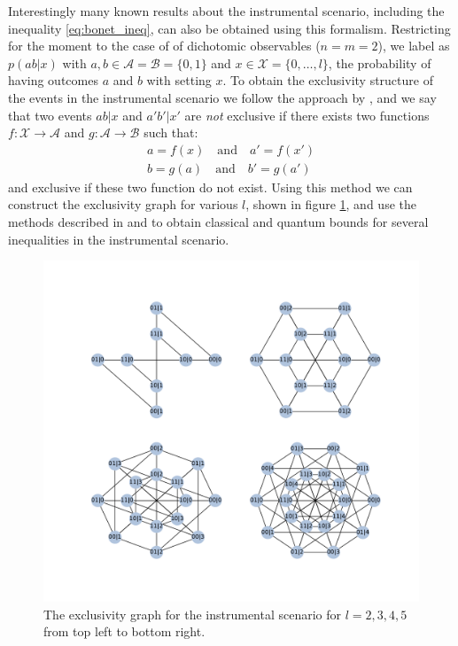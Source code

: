 \documentclass[floatfix, twocolumn, aps, prl]{revtex4-1}
\begin{document}
Interestingly many known results about the instrumental scenario, including the
inequality \eqref{eq:bonet_ineq}, can also be obtained using this formalism.
Restricting for the moment to the case of of dichotomic observables ($n=m=2$),
we label as $p(ab|x)$ with $a, b \in \mathcal{A} = \mathcal{B} = \{0,1\}$ and $x \in
\mathcal{X} = \{0,\ldots,l\}$, the probability of having outcomes $a$ and $b$ with setting $x$. 
To obtain the exclusivity structure of the events in the instrumental scenario
we follow the approach by \cite{bonet2001}, and we say that two events $ab|x$ and $a'b'|x'$ are \emph{not} exclusive
if there exists two functions $f:\mathcal{X} \rightarrow \mathcal{A}$ and
$g:\mathcal{A} \rightarrow \mathcal{B}$ such that:
\begin{align}
    a = f(x) \quad\text{and}\quad a'=f(x')\\
    b = g(a) \quad\text{and}\quad b'=g(a')
    \label{eq:non_exclusivity_condition}
\end{align}
and exclusive if these two function do not exist.
Using this method we can construct the exclusivity graph for various $l$,
shown in figure \ref{fig:instrumental_exgraphs}, and use the methods described
in \cite{cabello2014} and \cite{rabelo2014} to obtain classical and quantum
bounds for several inequalities in the instrumental scenario. 
\begin{figure}[h]
    \centering
    \includegraphics[width=.9\textwidth]{images/instrumental_exgraph.pdf}
    \caption{The exclusivity graph for the instrumental scenario for $l=2,3,4,5$
    from top left to bottom right.}
    \label{fig:instrumental_exgraphs}
\end{figure}
\end{document}
